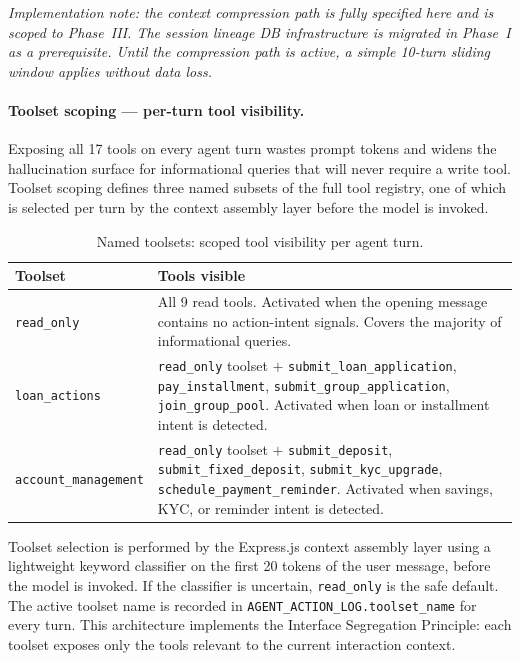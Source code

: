 \documentclass[12pt,a4paper]{report}
\begin{document}
\textit{Implementation note: the context compression path is fully specified here
and is scoped to Phase~III. The session lineage DB infrastructure is migrated in
Phase~I as a prerequisite. Until the compression path is active, a simple
10-turn sliding window applies without data loss.}

\paragraph{Toolset scoping --- per-turn tool visibility.}

Exposing all 17 tools on every agent turn wastes prompt tokens and widens the
hallucination surface for informational queries that will never require a write
tool. Toolset scoping defines three named subsets of the full tool registry, one
of which is selected per turn by the context assembly layer before the model is
invoked.

\begin{table}[H]
\centering
\caption{Named toolsets: scoped tool visibility per agent turn.}
\label{tab:toolsets}
\small
\begin{tabular}{p{3.5cm}p{9cm}}
\hline
\textbf{Toolset} & \textbf{Tools visible} \\
\hline
\texttt{read\_only} & All 9 read tools. Activated when the opening message contains
no action-intent signals. Covers the majority of informational queries. \\
\texttt{loan\_actions} & \texttt{read\_only} toolset $+$ \texttt{submit\_loan\_application},
\texttt{pay\_installment}, \texttt{submit\_group\_application},
\texttt{join\_group\_pool}. Activated when loan or installment intent is detected. \\
\texttt{account\_management} & \texttt{read\_only} toolset $+$ \texttt{submit\_deposit},
\texttt{submit\_fixed\_deposit}, \texttt{submit\_kyc\_upgrade},
\texttt{schedule\_payment\_reminder}. Activated when savings, KYC, or reminder
intent is detected. \\
\hline
\end{tabular}
\end{table}

\noindent Toolset selection is performed by the Express.js context assembly layer
using a lightweight keyword classifier on the first 20 tokens of the user message,
before the model is invoked. If the classifier is uncertain, \texttt{read\_only}
is the safe default. The active toolset name is recorded in
\texttt{AGENT\_ACTION\_LOG.toolset\_name} for every turn. This architecture
implements the Interface Segregation Principle: each toolset exposes only the tools
relevant to the current interaction context.
\end{document}
